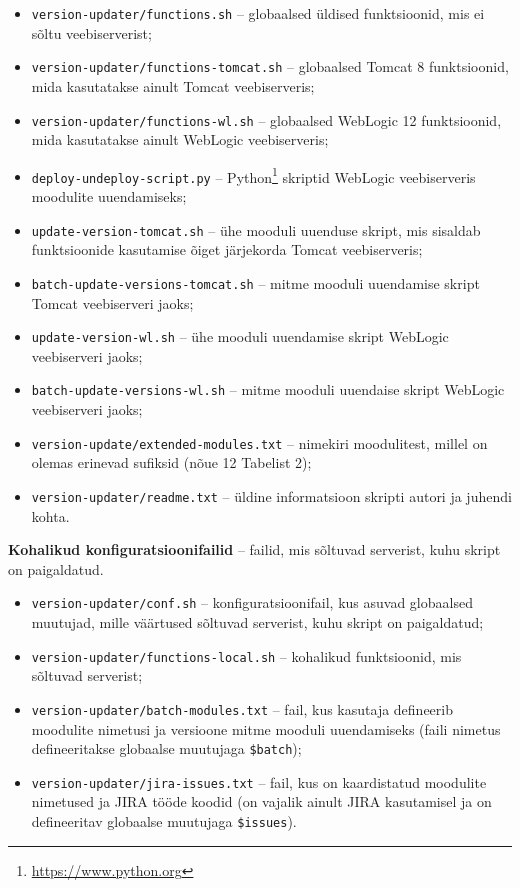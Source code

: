 \documentclass[12pt]{article}
\newcommand{\code}[1]{\texttt{#1}}
\begin{document}
  \begin{itemize}
    \item \code{version-updater/functions.sh} \--- globaalsed üldised funktsioonid, mis ei sõltu veebiserverist;
    \item \code{version-updater/functions-tomcat.sh} \--- globaalsed Tomcat 8 funktsioonid, mida kasutatakse ainult Tomcat veebiserveris;
    \item \code{version-updater/functions-wl.sh} \--- globaalsed WebLogic 12 funktsioonid, mida kasutatakse ainult WebLogic veebiserveris;
    \item \code{deploy-undeploy-script.py} \--- Python\footnote{\url{https://www.python.org}} skriptid WebLogic veebiserveris moodulite uuendamiseks;
    \item \code{update-version-tomcat.sh} \--- ühe mooduli uuenduse skript, mis sisaldab funktsioonide kasutamise õiget järjekorda Tomcat veebiserveris;
    \item \code{batch-update-versions-tomcat.sh} \--- mitme mooduli uuendamise skript Tomcat veebiserveri jaoks;
    \item \code{update-version-wl.sh} \--- ühe mooduli uuendamise skript WebLogic veebiserveri jaoks;
    \item \code{batch-update-versions-wl.sh} \--- mitme mooduli uuendaise skript WebLogic veebiserveri jaoks;
    \item \code{version-update/extended-modules.txt} \--- nimekiri moodulitest, millel on olemas erinevad sufiksid (nõue 12 Tabelist 2);
    \item \code{version-updater/readme.txt} \--- üldine informatsioon skripti autori ja juhendi kohta.
  \end{itemize}
  
  \textbf{Kohalikud konfiguratsioonifailid} \--- failid, mis sõltuvad serverist, kuhu skript on paigaldatud.
  
  \begin{itemize}
    \item \code{version-updater/conf.sh} \--- konfiguratsioonifail, kus asuvad globaalsed muutujad, mille väärtused sõltuvad serverist, kuhu skript on paigaldatud;
    \item \code{version-updater/functions-local.sh} \--- kohalikud funktsioonid, mis sõltuvad serverist;
    \item \code{version-updater/batch-modules.txt} \--- fail, kus kasutaja defineerib moodulite nimetusi ja versioone mitme mooduli uuendamiseks (faili nimetus defineeritakse globaalse muutujaga \code{\$batch});
    \item \code{version-updater/jira-issues.txt} \--- fail, kus on kaardistatud moodulite nimetused ja JIRA tööde koodid (on vajalik ainult JIRA kasutamisel ja on defineeritav globaalse muutujaga \code{\$issues}).
  \end{itemize}
  
\end{document}
